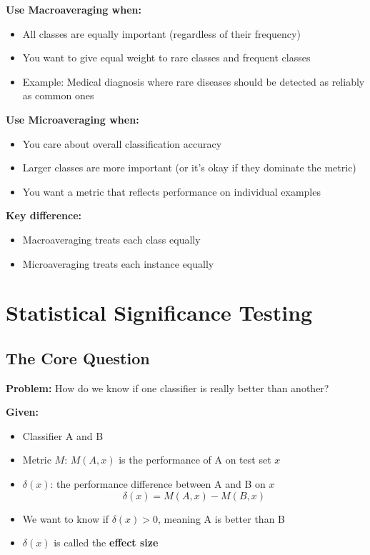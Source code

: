 \documentclass[11pt,a4paper]{article}
\theoremstyle{definition}
\theoremstyle{plain}
\theoremstyle{remark}
\begin{document}
\begin{tcolorbox}[colback=purple!5!white,colframe=purple!75!black,title=\textbf{Choosing Macro vs Micro Averaging}]
\textbf{Use Macroaveraging when:}
\begin{itemize}
    \item All classes are equally important (regardless of their frequency)
    \item You want to give equal weight to rare classes and frequent classes
    \item Example: Medical diagnosis where rare diseases should be detected as reliably as common ones
\end{itemize}

\textbf{Use Microaveraging when:}
\begin{itemize}
    \item You care about overall classification accuracy
    \item Larger classes are more important (or it's okay if they dominate the metric)
    \item You want a metric that reflects performance on individual examples
\end{itemize}

\textbf{Key difference:}
\begin{itemize}
    \item Macroaveraging treats each class equally
    \item Microaveraging treats each instance equally
\end{itemize}
\end{tcolorbox}

\section{Statistical Significance Testing}

\subsection{The Core Question}

\textbf{Problem:} How do we know if one classifier is really better than another?

\textbf{Given:}
\begin{itemize}
    \item Classifier A and B
    \item Metric $M$: $M(A, x)$ is the performance of A on test set $x$
    \item $\delta(x)$: the performance difference between A and B on $x$
    \[
    \delta(x) = M(A, x) - M(B, x)
    \]
    \item We want to know if $\delta(x) > 0$, meaning A is better than B
    \item $\delta(x)$ is called the \textbf{effect size}
\end{itemize}
\end{document}
